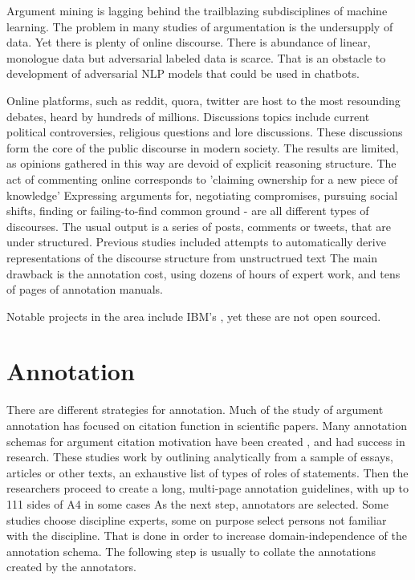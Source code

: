 \documentclass{report}
\begin{document}
Argument mining is lagging behind the trailblazing subdisciplines of machine learning. The problem in many studies of argumentation is the undersupply of data. Yet there is plenty of online discourse.
There is abundance of linear, monologue data but adversarial labeled data is scarce. That is an obstacle to development of adversarial NLP models that could be used in chatbots. 

Online platforms, such as reddit, quora, twitter are host to the most resounding debates, heard by hundreds of millions.  Discussions topics include current political controversies, religious questions and lore discussions. These discussions form the core of the public discourse in modern society.  The results are limited, as opinions gathered in this way are devoid of explicit reasoning structure.  The act of commenting online corresponds to 'claiming ownership for a new piece of knowledge' \cite{teufel_scientific_2014} Expressing arguments for, negotiating compromises, pursuing social shifts, finding or failing-to-find common ground - are all different types of discourses. The usual output is a series of posts, comments or tweets, that are under structured. 
Previous studies included attempts to automatically derive representations of the discourse structure from unstructrued text \cite{abbott_how_2011}
The main drawback is the annotation cost, using dozens of hours of expert work, and tens of pages of annotation manuals.

Notable projects in the area include IBM's \cite{slonim2021autonomous}, yet these are not open sourced.

\section{Annotation}
There are different strategies for annotation. Much of the study of argument annotation has focused on citation function in scientific papers.
Many annotation schemas for argument citation motivation have been created \cite{teufel_scientific_2014}, \cite{mann_rhetorical_1987} and had success in research.
These studies work by outlining analytically from a sample of essays, articles or other texts, an exhaustive list of types of roles of statements.
Then the researchers proceed to create a long, multi-page annotation guidelines, with up to 111 sides of A4 in some cases \cite{teufel_towards_2009}
As the next step, annotators are selected. Some studies choose discipline experts, some on purpose select persons not familiar with the discipline.
That is done in order to increase domain-independence of the annotation schema.
The following step is usually to collate the annotations created by the annotators. 
\end{document}
